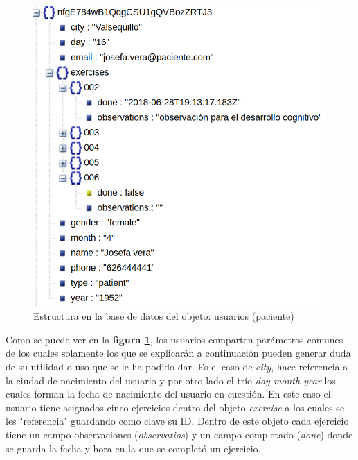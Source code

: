 \medskip
\begin{figure}
    \includegraphics[width=\linewidth]{./images/database/user-patient.png}
    \caption{Estructura en la base de datos del objeto: usuarios (paciente)}
    \label{user-patient}
\end{figure}

Como se puede ver en la \textbf{figura \ref{user-patient}},
los usuarios comparten parámetros comunes de los cuales solamente los que
se explicarán a continuación pueden generar duda de su utilidad o uso que se
le ha podido dar. Es el caso de \textit{city}, hace referencia a la ciudad de
nacimiento del usuario y por otro lado el trío \textit{day-month-year} los
cuales forman la fecha de nacimiento del usuario en cuestión.
En este caso el usuario tiene asignados cinco ejercicios dentro del objeto
\textit{exercise} a los cuales se les "referencia" guardando como clave su ID.
Dentro de este objeto cada ejercicio tiene un campo observaciones
(\textit{observatios}) y un campo completado (\textit{done}) donde se guarda
la fecha y hora en la que se completó un ejercicio.


